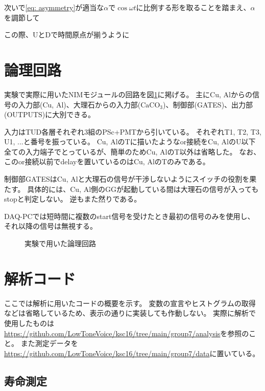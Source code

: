 \documentclass[dvipdfmx]{jsarticle}
\makeatletter
\renewcommand{\theequation}{\thesection.\arabic{equation}}
\renewcommand{\thefigure}{\thesection.\arabic{figure}}
\renewcommand{\thetable}{\thesection.\arabic{table}}
\renewcommand{\appendix}{\par
        \setcounter{section}{0}
        \setcounter{subsection}{0}
        \gdef\presectionname{\appendixname}
        \gdef\postsectionname{}
        \gdef\thesection{\presectionname\@Alph\c@section\postsectionname}
        \gdef\thesubsection{\@Alph\c@section.\@arabic\c@subsection}
        \renewcommand{\theequation}{\@Alph\c@section.\arabic{equation}}%
        \renewcommand{\thefigure}{\@Alph\c@section.\arabic{figure}}%
        \renewcommand{\thetable}{\@Alph\c@section.\arabic{table}}%
    }
\makeatother
\begin{document}
次いで\eqref{eq: asymmetry}が適当な$\alpha$で$\cos\omega t$に比例する形を取ることを踏まえ、$\alpha$を調節して

この際、UとDで時間原点が揃うように


\appendix


\section{論理回路}
\label{sec: logic circuit}

実験で実際に用いたNIMモジュールの回路を図\ref{fig: full circuit}に掲げる。
主にCu, Alからの信号の入力部(Cu, Al)、大理石からの入力部($\mathrm{CaCO_3}$)、制御部(GATES)、出力部(OUTPUTS)に大別できる。

入力はTUD各層それぞれ3組のPSc+PMTから引いている。
それぞれT1, T2, T3, U1, ...と番号を振っている。
Cu, AlのTに描いたようなor接続をCu, AlのU以下全ての入力端子でとっているが、簡単のためCu, AlのT以外は省略した。
なお、このor接続以前でdelayを置いているのはCu, AlのTのみである。

制御部GATESはCu, Alと大理石の信号が干渉しないようにスイッチの役割を果たす。
具体的には、Cu, Al側のGGが起動している間は大理石の信号が入ってもstopと判定しない。
逆もまた然りである。

DAQ-PCでは短時間に複数のstart信号を受けたとき最初の信号のみを使用し、それ以降の信号は無視する。

\begin{landscape}
    \begin{figure}
        \centering
        
        \caption{実験で用いた論理回路}
        \label{fig: full circuit}
    \end{figure}
\end{landscape}


\section{解析コード}

ここでは解析に用いたコードの概要を示す。
変数の宣言やヒストグラムの取得などは省略しているため、表示の通りに実装しても作動しない。
実際に解析で使用したものは\url{https://github.com/LowToneVoice/ksc16/tree/main/group7/analysis}を参照のこと。
また測定データを\url{https://github.com/LowToneVoice/ksc16/tree/main/group7/data}に置いている。

\subsection{寿命測定}
\end{document}
